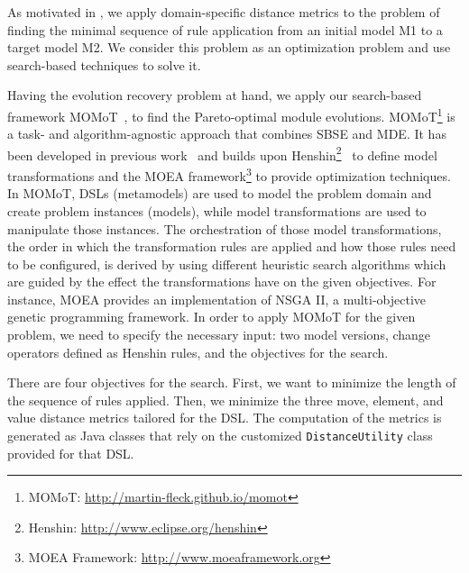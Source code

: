 
As motivated in , we apply domain-specific distance metrics to the problem of finding the minimal sequence of rule application from an initial model M1 to a target model M2.
We consider this problem as an optimization problem and use search-based techniques to solve it.

Having the evolution recovery problem at hand, we apply our search-based framework MOMoT~\cite{Fleck15,FleckTW16}, to find the Pareto-optimal module evolutions.
MOMoT\footnote{
    MOMoT: \url{http://martin-fleck.github.io/momot}
} is a task- and algorithm-agnostic approach that combines SBSE and MDE.
It has been developed in previous work~\cite{Fleck15} and builds upon Henshin\footnote{
    Henshin: \url{http://www.eclipse.org/henshin}
}~\cite{Arendt10} to define model transformations and the MOEA framework\footnote{
    MOEA Framework: \url{http://www.moeaframework.org}
} to provide optimization techniques.
In MOMoT, DSLs (\ie metamodels) are used to model the problem domain and create problem instances (\ie models), while model transformations are used to manipulate those instances.
The orchestration of those model transformations, \ie the order in which the transformation rules are applied and how those rules need to be configured, is derived by using different heuristic search algorithms which are guided by the effect the transformations have on the given objectives.
For instance, MOEA provides an implementation of NSGA II, a multi-objective genetic programming framework.
In order to apply MOMoT for the given problem, we need to specify the necessary input: two model versions, change operators defined as Henshin rules, and the objectives for the search.

There are four objectives for the search.
First, we want to minimize the length of the sequence of rules applied.
Then, we minimize the three move, element, and value distance metrics tailored for the DSL.
The computation of the metrics is generated as Java classes that rely on the customized \texttt{DistanceUtility} class provided for that DSL.